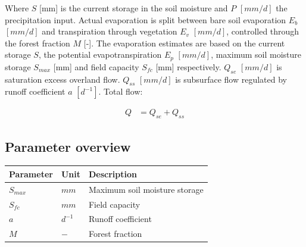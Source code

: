 Where $S$ [mm] is the current storage in the soil moisture and $P$ $[mm/d]$ the precipitation input. 
Actual evaporation is split between bare soil evaporation $E_b$ $[mm/d]$ and transpiration through vegetation $E_v$ $[mm/d]$, controlled through the forest fraction $M$ [-]. 
The evaporation estimates are based on the current storage $S$, the potential evapotranspiration $E_p$ $[mm/d]$, maximum soil moisture storage $S_{max}$ [mm] and field capacity $S_{fc}$ [mm] respectively. 
$Q_{se}$ $[mm/d]$ is saturation excess overland flow.  $Q_{ss}$ $[mm/d]$ is subsurface flow regulated by runoff coefficient $a$ $[d^{-1}]$.
Total flow:

\begin{align}
	Q &= Q_{se}+Q_{ss}
\end{align}

\newpage
\subsection{Parameter overview}
\begin{table}[htbp]
  \centering
    \begin{tabular}{lll}
    \toprule
    Parameter & Unit  & Description \\
    \midrule
    $S_{max}$ & $mm$  & Maximum soil moisture storage \\
    $S_{fc}$ & $mm$  & Field capacity \\
    $a$   & $d^{-1}$ & Runoff coefficient \\
    $M$   & $-$   & Forest fraction \\
    \bottomrule
    \end{tabular}%
  \label{tab:addlabel}%
\end{table}%
